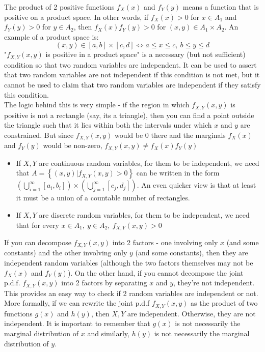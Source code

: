 \begin{note}
\end{note}
The product of 2 positive functions $f_X(x)$ and $f_Y(y)$ means a function that is positive on a product space. In other words, if $f_X(x) > 0$ for $x \in A_1$ and $f_Y(y) > 0$ for $y \in A_2$, then $f_X(x)f_Y(y) > 0$ for $(x,y) \in A_1 \times A_2$. An example of a product space is:
$$
(x,y) \in [a,b] \times [c,d] \iff a \leq x \leq c, \ b \leq y \leq d
$$
"$f_{X,Y}(x,y)$ is positive in a product space" is a necessary (but not sufficient) condition so that two random variables are independent. It can be used to assert that two random variables are not independent if this condition is not met, but it cannot be used to claim that two random variables are independent if they satisfy this condition. \\
The logic behind this is very simple - if the region in which $f_{X,Y}(x,y)$ is positive is not a rectangle (say, its a triangle), then you can find a point outside the triangle such that it lies within both the intervals under which $x$ and $y$ are constrained. But since $f_{X,Y}(x,y)$ would be 0 there and the marginals $f_X(x)$ and $f_Y(y)$ would be non-zero, $f_{X,Y}(x,y) \neq f_X(x)f_Y(y)$
\begin{itemize}
    \item If $X,Y$ are continuous random variables, for them to be independent, we need that $A = \left\{ (x,y) | f_{X,Y} (x,y) > 0 \right\}$ can be written in the form $(\bigcup_{i = 1}^{\infty}[a_i,b_i]) \times (\bigcup_{j = 1}^{\infty}[c_j,d_j])$. An even quicker view is that at least it must be a union of a countable number of rectangles.
    \item If $X,Y$ are discrete random variables, for them to be independent, we need that for every $x \in A_1,\  y \in A_2, \ f_{X,Y} (x,y) > 0$
\end{itemize}
If you can decompose $f_{X,Y}(x,y)$ into 2 factors - one involving only $x$ (and some constants) and the other involving only $y$ (and some constants), then they are independent random variables (although the two factors themselves may not be $f_X(x)$ and $f_Y(y)$). On the other hand, if you cannot decompose the joint p.d.f. $f_{X,Y}(x,y)$ into 2 factors by separating $x$ and $y$, they're  not independent. This provides an easy way to check if 2 random variables are independent or not. \\
More formally, if we can rewrite the joint p.d.f $f_{X,Y}(x,y)$ as the product of two functions $g(x)$ and $h(y)$, then $X,Y$ are independent. Otherwise, they are not independent. It is important to remember that $g(x)$ is not necessarily the marginal distribution of $x$ and similarly, $h(y)$ is not necessarily the marginal distribution of $y$.

